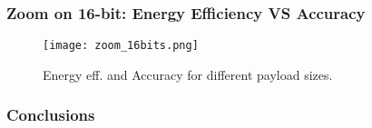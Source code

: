 \begin{frame}
    \frametitle{Zoom on 16-bit: Energy Efficiency VS Accuracy}
     \begin{figure}
         \centering
         \texttt{[image: zoom\_16bits.png]}
         \caption{Energy eff. and Accuracy for different payload sizes.}
         \label{fig:accuracy}
     \end{figure}

\end{frame}

\subsubsection{Conclusions}
%
%

